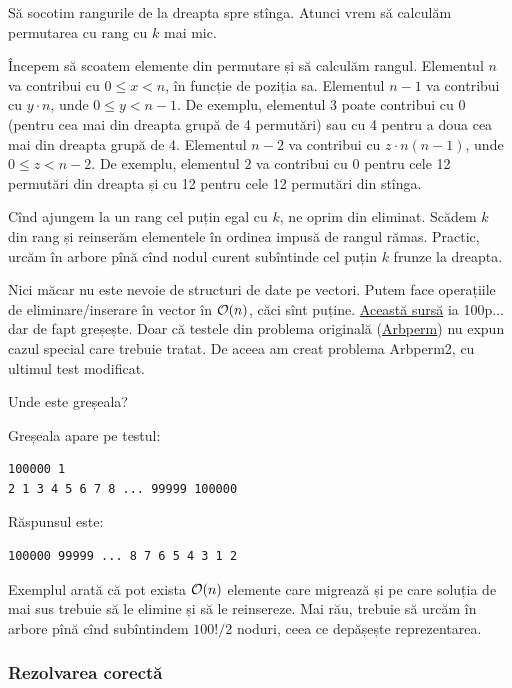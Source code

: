 \documentclass[../main.tex]{subfiles}
\begin{document}
Să socotim rangurile de la dreapta spre stînga. Atunci vrem să calculăm permutarea cu rang cu $k$ mai mic.

Începem să scoatem elemente din permutare și să calculăm rangul. Elementul $n$ va contribui cu $0 \leq x < n$, în funcție de poziția sa. Elementul $n-1$ va contribui cu $y \cdot n$, unde $0 \leq y < n - 1$. De exemplu, elementul $3$ poate contribui cu 0 (pentru cea mai din dreapta grupă de 4 permutări) sau cu 4 pentru a doua cea mai din dreapta grupă de 4. Elementul $n-2$ va contribui cu $z \cdot n(n-1)$, unde $0 \leq z < n - 2$. De exemplu, elementul $2$ va contribui cu 0 pentru cele 12 permutări din dreapta și cu 12 pentru cele 12 permutări din stînga.

Cînd ajungem la un rang cel puțin egal cu $k$, ne oprim din eliminat. Scădem $k$ din rang și reinserăm elementele în ordinea impusă de rangul rămas. Practic, urcăm în arbore pînă cînd nodul curent subîntinde cel puțin $k$ frunze la dreapta.

Nici măcar nu este nevoie de structuri de date pe vectori. Putem face operațiile de eliminare/inserare în  vector în $\mathcal{O}(n)$, căci sînt puține. \href{https://www.nerdarena.ro/job_detail/807889?action=view-source}{Această sursă} ia 100p... dar de fapt greșește. Doar că testele din problema originală (\href{https://www.nerdarena.ro/problema/arbperm}{Arbperm}) nu expun cazul special care trebuie tratat. De aceea am creat problema Arbperm2, cu ultimul test modificat.

Unde este greșeala?

Greșeala apare pe testul:

\begin{verbatim}
100000 1
2 1 3 4 5 6 7 8 ... 99999 100000
\end{verbatim}

Răspunsul este:

\begin{verbatim}
100000 99999 ... 8 7 6 5 4 3 1 2
\end{verbatim}

Exemplul arată că pot exista $\mathcal{O}(n)$ elemente care migrează și pe care soluția de mai sus trebuie să le elimine și să le reinsereze. Mai rău, trebuie să urcăm în arbore pînă cînd subîntindem $100!/2$ noduri, ceea ce depășește reprezentarea.

\subsubsection*{Rezolvarea corectă}
\end{document}
